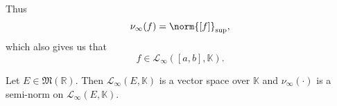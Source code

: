 \documentclass[notoc,notitlepage]{tufte-book}
\begin{document}
\begin{eg}
\begin{enumerate}
    Thus
    \begin{equation*}
      \nu_\infty(f) = \norm{[f]}_{\sup},
    \end{equation*}
    which also gives us that
    \begin{equation*}
      f \in \mathcal{L}_\infty([a, b], \mathbb{K}).
    \end{equation*}
  \end{enumerate}
\end{eg}

\begin{propo}\label{propo:_l_infty_e_k_is_a_vector_space_and_nu_infty_cdot_a_semi_norm}
  Let $E \in \mathfrak{M}(\mathbb{R})$. Then $\mathcal{L}_\infty(E, \mathbb{K})$ 
  is a vector space over $\mathbb{K}$ and $\nu_\infty(\cdot)$ is a semi-norm on
  $\mathcal{L}_\infty(E, \mathbb{K})$.
\end{propo}
\end{document}
